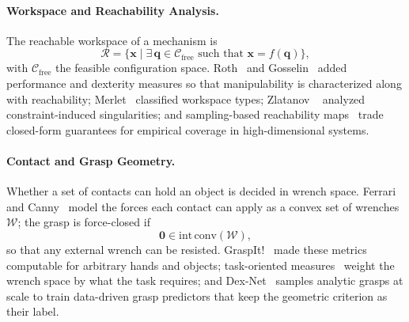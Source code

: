 \paragraph{Workspace and Reachability Analysis.}
The reachable workspace of a mechanism is
\begin{equation}
\mathcal{R} = \{ \mathbf{x} \mid \exists\, \mathbf{q} \in \mathcal{C}_{\mathrm{free}}
\text{ such that } \mathbf{x} = f(\mathbf{q}) \},
\end{equation}
with $\mathcal{C}_{\mathrm{free}}$ the feasible configuration space. Roth~\cite{Roth1975Performance} and Gosselin~\cite{Gosselin1990Singularity} added performance and dexterity measures so that manipulability is characterized along with reachability; Merlet~\cite{Merlet1998Workspace} classified workspace types; Zlatanov \etal~\cite{Zlatanov1994Constraints} analyzed constraint-induced singularities; and sampling-based reachability maps~\cite{lu2026richmap} trade closed-form guarantees for empirical coverage in high-dimensional systems.

\paragraph{Contact and Grasp Geometry.}
Whether a set of contacts can hold an object is decided in wrench space. Ferrari and Canny~\cite{Ferrari1992Grasp} model the forces each contact can apply as a convex set of wrenches $\mathcal{W}$; the grasp is force-closed if
\begin{equation}
\mathbf{0} \in \text{int}\,\text{conv}(\mathcal{W}),
\label{eq:p3_s7_1_1_force_closure}
\end{equation}
so that any external wrench can be resisted. GraspIt!~\cite{Miller2004GraspIt} made these metrics computable for arbitrary hands and objects; task-oriented measures~\cite{Lin2015TaskGrasp} weight the wrench space by what the task requires; and Dex-Net~\cite{Mahler2017DexNet} samples analytic grasps at scale to train data-driven grasp predictors that keep the geometric criterion as their label.

